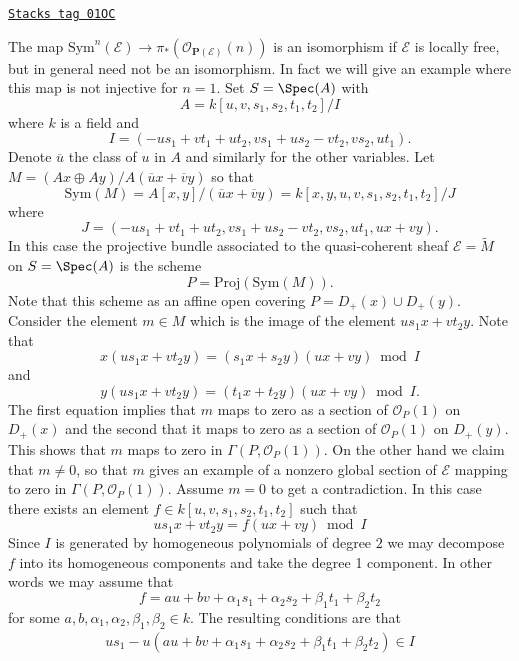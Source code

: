 \begin{example}
\label{constructions-example-projective-bundle}
\href{https://stacks.math.columbia.edu/tag/01OC}{\texttt{Stacks tag 01OC}}

The map $\text{Sym}^n(\mathcal{E}) \to
\pi_*(\mathcal{O}_{\mathbf{P}(\mathcal{E})}(n))$
is an isomorphism if $\mathcal{E}$ is locally free, but in general
need not be an isomorphism. In fact we will give an example where
this map is not injective for $n = 1$. Set $S = \Spec(A)$ with
$$
A = k[u, v, s_1, s_2, t_1, t_2]/I
$$
where $k$ is a field and
$$
I = (-us_1 + vt_1 + ut_2, vs_1 + us_2 - vt_2, vs_2, ut_1).
$$
Denote $\overline{u}$ the class of $u$ in $A$ and similarly for
the other variables.
Let $M = (Ax \oplus Ay)/A(\overline{u}x + \overline{v}y)$ so that
$$
\text{Sym}(M) = A[x, y]/(\overline{u}x + \overline{v}y)
= k[x, y, u, v, s_1, s_2, t_1, t_2]/J
$$
where
$$
J = (-us_1 + vt_1 + ut_2, vs_1 + us_2 - vt_2, vs_2, ut_1, ux + vy).
$$
In this case the projective bundle associated to the quasi-coherent
sheaf $\mathcal{E} = \widetilde{M}$ on $S = \Spec(A)$ is the scheme
$$
P =
\text{Proj}(\text{Sym}(M)).
$$
Note that this scheme as an affine open covering
$P = D_{+}(x) \cup D_{+}(y)$.
Consider the element
$m \in M$ which is the image of the element
$us_1x + vt_2y$. Note that
$$
x(us_1x + vt_2y) = (s_1x + s_2y)(ux + vy) \bmod I
$$
and
$$
y(us_1x + vt_2y) = (t_1x + t_2y)(ux + vy) \bmod I.
$$
The first equation implies that $m$ maps to zero as a
section of $\mathcal{O}_P(1)$ on $D_{+}(x)$ and the second
that it maps to zero as a section of $\mathcal{O}_P(1)$ on $D_{+}(y)$.
This shows that $m$ maps to zero in $\Gamma(P, \mathcal{O}_P(1))$.
On the other hand we claim that $m \not = 0$, so that $m$ gives
an example of a nonzero global section of $\mathcal{E}$ mapping to zero
in $\Gamma(P, \mathcal{O}_P(1))$. Assume $m = 0$
to get a contradiction. In this case there exists
an element $f \in k[u, v, s_1, s_2, t_1, t_2]$ such that
$$
us_1x + vt_2y = f(ux + vy) \bmod I
$$
Since $I$ is generated by homogeneous polynomials of degree $2$ we
may decompose $f$ into its homogeneous components and take the
degree 1 component. In other words we may assume that
$$
f = au + bv + \alpha_1s_1 + \alpha_2s_2 + \beta_1t_1 + \beta_2t_2
$$
for some $a, b, \alpha_1, \alpha_2, \beta_1, \beta_2 \in k$.
The resulting conditions are that
$$
\begin{matrix}
us_1 - u(au + bv + \alpha_1s_1 + \alpha_2s_2 + \beta_1t_1 + \beta_2t_2)
\in I \\

\end{matrix}$$
\end{example}
